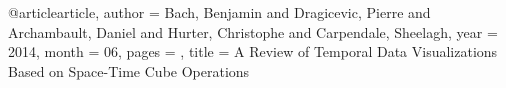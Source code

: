 @article{article,
author = {Bach, Benjamin and Dragicevic, Pierre and Archambault, Daniel and Hurter, Christophe and Carpendale, Sheelagh},
year = {2014},
month = {06},
pages = {},
title = {A Review of Temporal Data Visualizations Based on Space-Time Cube Operations}
}